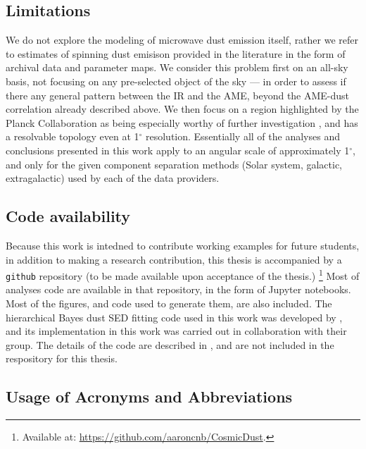   \subsection{Limitations}
    We do not explore the modeling of microwave dust emission itself, rather we refer to estimates of spinning dust emisison provided in the literature \citep{planckXII, wmap03b} in the form of archival data and parameter maps. We consider this problem first on an all-sky basis, not focusing on any pre-selected object of the sky --- in order to assess if there any general pattern between the IR and the AME, beyond the AME-dust correlation already described above. We then focus on a region highlighted by the Planck Collaboration as being especially worthy of further investigation \citep{planck15X}, and has a resolvable topology even at 1$^\circ$ resolution. Essentially all of the analyses and conclusions presented in this work apply to an angular scale of approximately 1$^\circ$, and only for the given component separation methods (Solar system, galactic, extragalactic) used by each of the data providers.

  \subsection{Code availability}
    Because this work is intedned to contribute working examples for future students, in addition to making a research contribution, this thesis is accompanied by a {\tt github} repository (to be made available upon acceptance of the thesis.) \footnote{Available at: \url{https://github.com/aaroncnb/CosmicDust}.} Most of analyses code are available in that repository, in the form of Jupyter notebooks. Most of the figures, and code used to generate them, are also included. The hierarchical Bayes dust SED fitting code used in this work was developed by \cite{galliano18}, and its implementation in this work was carried out in collaboration with their group. The details of the code are described in \cite{galliano18}, and are not included in the respository for this thesis.

  \subsection{Usage of Acronyms and Abbreviations}
